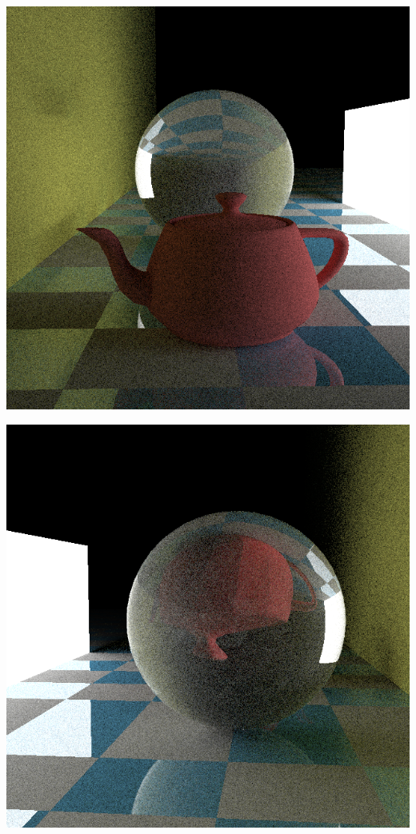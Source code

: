 \begin{center}
\begin{minipage}{0.48\linewidth}
\includegraphics[width=\linewidth]{img/teapot-in-front-of-sphere.png}
\end{minipage}
\begin{minipage}{0.48\linewidth}
\includegraphics[width=\linewidth]{img/teapot-through-sphere.png}
\end{minipage}
\end{center}

